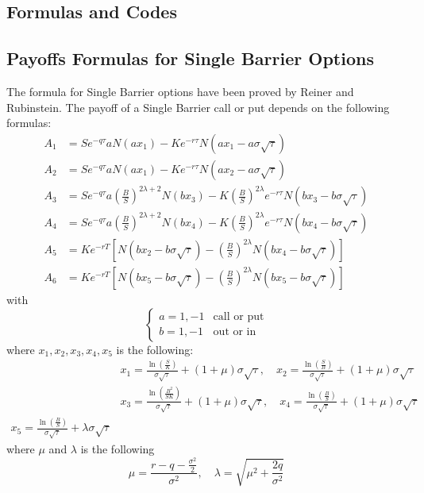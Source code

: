 \begin{appendices}
\chapter{Formulas and Codes}
\section{Payoffs Formulas for Single Barrier Options}
\label{section:A1}
The formula for Single Barrier options have been proved by Reiner and Rubinstein. The payoff of a Single Barrier call or put depends on the following formulas:
\[
\begin{aligned}
	A_1&=Se^{-q\tau}aN(ax_1)-Ke^{-r\tau}N(ax_1-a\sigma\sqrt{\tau})\\
	A_2&=Se^{-q\tau}aN(ax_1)-Ke^{-r\tau}N(ax_2-a\sigma\sqrt{\tau})\\
	A_3&=Se^{-q\tau}a\left(\tfrac{B}{S}\right)^{2\lambda+2}N(bx_3)-K\left(\tfrac{B}{S}\right)^{2\lambda}e^{-r\tau}N(bx_3-b\sigma\sqrt{\tau})\\
	A_4&=Se^{-q\tau}a\left(\tfrac{B}{S}\right)^{2\lambda+2}N(bx_4)-K\left(\tfrac{B}{S}\right)^{2\lambda}e^{-r\tau}N(bx_4-b\sigma\sqrt{\tau})\\
	A_5&=Ke^{-rT}\left[N(bx_2-b\sigma\sqrt{\tau})-\left(\tfrac{B}{S}\right)^{2\lambda}N\left(bx_4-b\sigma\sqrt{\tau}\right)\right]\\
	A_6&=Ke^{-rT}\left[N(bx_5-b\sigma\sqrt{\tau})-\left(\tfrac{B}{S}\right)^{2\lambda}N\left(bx_5-b\sigma\sqrt{\tau}\right)\right]
\end{aligned}
\]
with
\[
\begin{cases}
	a=1,-1&\text{call or put}\\
	b=1,-1&\text{out or in}
\end{cases}
\]
where $x_1,x_2,x_3,x_4,x_5$ is the following:
\[
\begin{aligned}
	&x_1=\frac{\ln\left(\frac{S}{K}\right)}{\sigma\sqrt{\tau}}+(1+\mu)\sigma\sqrt{\tau},\quad x_2=\frac{\ln\left(\frac{S}{B}\right)}{\sigma\sqrt{\tau}}+(1+\mu)\sigma\sqrt{\tau}\\
	&x_3=\frac{\ln\left(\frac{B^2}{SK}\right)}{\sigma\sqrt{\tau}}+(1+\mu)\sigma\sqrt{\tau},\quad x_4=\frac{\ln\left(\frac{B}{S}\right)}{\sigma\sqrt{\tau}}+(1+\mu)\sigma\sqrt{\tau}\\
	x_5=\frac{\ln\left(\frac{B}{S}\right)}{\sigma\sqrt{\tau}}+\lambda\sigma\sqrt{\tau}
\end{aligned}
\]
where $\mu$ and $\lambda$ is the following
\[
\mu=\frac{r-q-\tfrac{\sigma^2}{2}}{\sigma^2},\quad\lambda=\sqrt{\mu^2+\frac{2q}{\sigma^2}}
\]
\newpage

\end{appendices}
